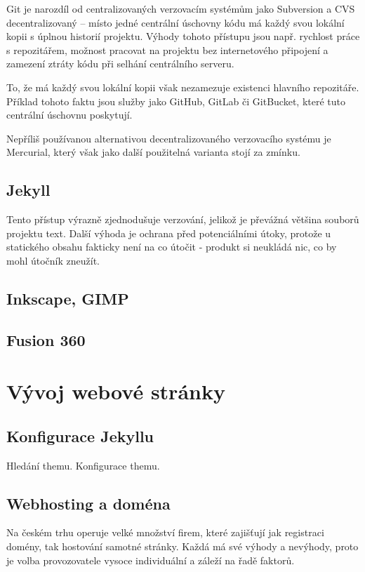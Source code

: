 \documentclass[a4paper, 12pt]{article}
\begin{document}
  Git je narozdíl od centralizovaných verzovacím systémům jako Subversion a CVS decentralizovaný -- místo jedné centrální úschovny kódu má každý svou lokální kopii s úplnou historií projektu. Výhody tohoto přístupu jsou např. rychlost práce s repozitářem, možnost pracovat na projektu bez internetového připojení a zamezení ztráty kódu při selhání centrálního serveru\cite{cvcs-vs-dvcs}.

  To, že má každý svou lokální kopii však nezamezuje existenci hlavního repozitáře. Příklad tohoto faktu jsou služby jako GitHub, GitLab či GitBucket, které tuto centrální úschovnu poskytují.

  Nepříliš používanou\cite{version-control-usage-statistics} alternativou decentralizovaného verzovacího systému je Mercurial, který však jako další použitelná varianta stojí za zmínku.


  \subsection{Jekyll}

  Tento přístup výrazně zjednodušuje verzování, jelikož je převážná většina souborů projektu text. Další výhoda je ochrana před potenciálními útoky, protože u statického obsahu fakticky není na co útočit - produkt si neukládá nic, co by mohl útočník zneužít.

  \subsection{Inkscape, GIMP}

  \subsection{Fusion 360}


  \section{Vývoj webové stránky}

  \subsection{Konfigurace Jekyllu}
  Hledání themu.
  Konfigurace themu.

  \subsection{Webhosting a doména}
  Na českém trhu operuje velké množství firem, které zajišťují jak registraci domény, tak hostování samotné stránky. Každá má své výhody a nevýhody, proto je volba provozovatele vysoce individuální a záleží na řadě faktorů.
\end{document}
